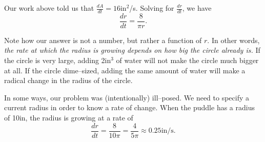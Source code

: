 {\begin{enumerate}
Our work above told us that $\frac{dA}{dt} = 16$in$^2$/s. Solving for $\frac{dr}{dt}$, we have $$\frac{dr}{dt} = \frac{8}{\pi r}.$$

Note how our answer is not a number, but rather a function of $r$. In other words, \textit{the rate at which the radius is growing depends on how big the circle already is.} If the circle is very large, adding 2in$^3$ of water will not make the circle much bigger at all. If the circle dime--sized, adding the same amount of water will make a radical change in the radius of the circle.

In some ways, our problem was (intentionally) ill--posed. We need to specify a current radius in order to know a rate of change. When the puddle has a radius of 10in, the radius is growing at a rate of $$
\frac{dr}{dt} = \frac{8}{10\pi} = \frac{4}{5\pi} \approx 0.25\text{in/s}.$$
 
\end{enumerate}
\baselineskip
}\\

